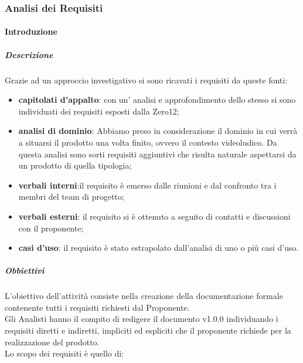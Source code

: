         \subsubsection{Analisi dei Requisiti}
            \paragraph{Introduzione}
                \subparagraph{Descrizione}
                    Grazie ad un approccio investigativo si sono ricavati i requisiti da queste fonti:\\
                    \begin{itemize}
                        \item\textbf{capitolati d’appalto}: con un’ analisi e approfondimento dello stesso si sono individuati dei requisiti esposti dalla Zero12;
                        \item\textbf{analisi di dominio}: Abbiamo preso in considerazione il dominio in cui verrà a situarsi il prodotto una volta finito, ovvero il contesto videoludico. Da questa analisi sono sorti requisiti aggiuntivi che risulta naturale aspettarsi da un prodotto di quella tipologia;
                        \item\textbf{verbali interni}:il requisito è emerso dalle riunioni e dal confronto tra i membri del team di progetto;
                        \item\textbf{verbali esterni}: il requisito si è ottenuto a seguito di contatti e discussioni con il proponente;
                        \item\textbf{casi d’uso}: il requisito è stato estrapolato dall'analisi di uno o più casi d’uso.
                    \end{itemize}
                \subparagraph{Obbiettivi}
                    L’obiettivo dell'attività consiste nella creazione della documentazione formale contenente tutti i requisiti richiesti dal Proponente.\\
                    Gli Analisti hanno il compito di redigere il documento  v1.0.0 individuando i requisiti diretti e indiretti, impliciti ed espliciti che il proponente richiede per la realizzazione del prodotto.\\
                    Lo scopo dei requisiti è quello di:\\
